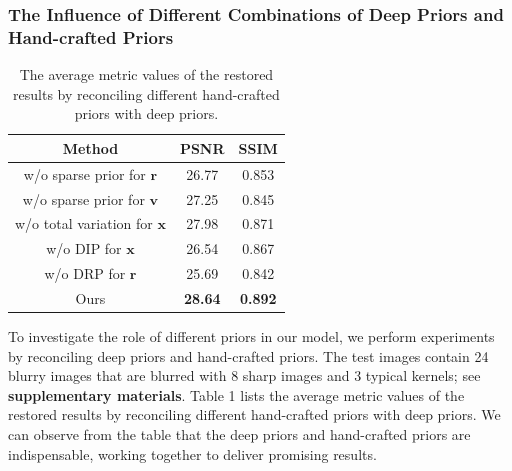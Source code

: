 \documentclass[10pt,twocolumn,letterpaper]{article}
\begin{document}
	\subsubsection{The Influence of Different Combinations of Deep Priors and Hand-crafted Priors} 
	\begin{table}[!h]
		\centering
		\caption{The average metric values of the restored results by reconciling different hand-crafted priors with deep priors.}
		{
			\renewcommand{\arraystretch}{0.9}
			\begin{tabular}{c|cc}
				\toprule
				Method&PSNR&SSIM\\\midrule
				w/o sparse prior for $\bm r$&26.77&0.853\\
				w/o sparse prior for $\bm v$&27.25&0.845\\
				w/o total variation for $\bm x$&27.98&0.871\\
				w/o DIP for $\bm x$ &26.54&0.867\\
				w/o DRP for $\bm r$&25.69&0.842\\
				Ours&\textbf{28.64}&\textbf{0.892}\\\bottomrule
			\end{tabular}
		}
	\end{table}
	To investigate the role of different priors in our model, we perform experiments by reconciling deep priors and hand-crafted priors. The test images contain 24 blurry images that are blurred with 8 sharp images  and  3 typical kernels; see \textbf{supplementary materials}.
	Table 1 lists the average metric values of the restored results by reconciling different hand-crafted priors with deep priors. We can observe from  the table that the deep priors and hand-crafted priors are indispensable, working together to deliver promising results. 
	
\end{document}
